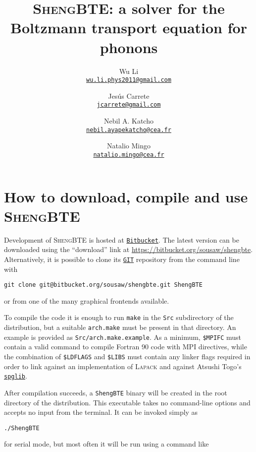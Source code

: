 \documentclass[a4paper,10pt,english]{article}
\title{\textsc{ShengBTE}: a solver for the Boltzmann transport equation for phonons}
\author{
  Wu Li\\\href{mailto:wu.li.phys2011@gmail.com}{\nolinkurl{wu.li.phys2011@gmail.com}}
  \and
  Jes\'us Carrete\\\href{mailto:jcarrete@gmail.com}{\nolinkurl{jcarrete@gmail.com}}
  \and
  Nebil A. Katcho\\\href{mailto:nebil.ayapekatcho@cea.fr}{\nolinkurl{nebil.ayapekatcho@cea.fr}}
  \and
  Natalio Mingo\\\href{mailto:natalio.mingo@cea.fr}{\nolinkurl{natalio.mingo@cea.fr}}
}
\date{}
\begin{document}
\maketitle

\tableofcontents
\newpage


\section{How to download, compile and use \textsc{ShengBTE}}

Development of \textsc{ShengBTE} is hosted at \href{http://www.bitbucket.org}{\nolinkurl{Bitbucket}}. The latest version can be downloaded using the ``download'' link at \url{https://bitbucket.org/sousaw/shengbte}. Alternatively, it is possible to clone its \href{http://git-scm.com/}{\nolinkurl{GIT}} repository from the command line with

\begin{verbatim}
git clone git@bitbucket.org/sousaw/shengbte.git ShengBTE
\end{verbatim}

\noindent or from one of the many graphical frontends available.

To compile the code it is enough to run \texttt{make} in the \texttt{Src} subdirectory of the distribution, but a suitable \texttt{arch.make} must be present in that directory. An example is provided as \texttt{Src/arch.make.example}. As a minimum, \texttt{\$MPIFC} must contain a valid command to compile Fortran 90 code with MPI directives, while the combination of \texttt{\$LDFLAGS} and \texttt{\$LIBS} must contain any linker flags required in order to link against an implementation of \textsc{Lapack} and against Atsushi Togo's \href{http://spglib.sourceforge.net/}{\nolinkurl{spglib}}.

After compilation succeeds, a \texttt{ShengBTE} binary will be created in the root directory of the distribution. This executable takes no command-line options and accepts no input from the terminal. It can be invoked simply as

\begin{verbatim}
./ShengBTE
\end{verbatim}

\noindent for serial mode, but most often it will be run using a command like
\end{document}
